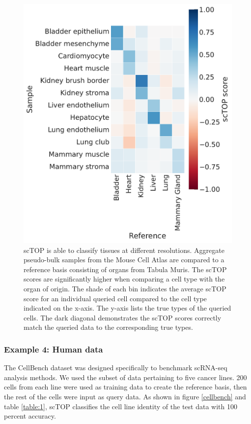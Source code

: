 \documentclass[aps,superscriptaddress, notitlepage,longbibliography]{revtex4-1}
\begin{document}
\begin{figure}
	\centering
    \includegraphics[scale=0.5]{figs/tabula muris heatmap.pdf}
	\caption{scTOP is able to classify tissues at different resolutions. Aggregate pseudo-bulk samples from the Mouse Cell Atlas are compared to a reference basis consisting of organs from Tabula Muris. The scTOP scores are significantly higher when comparing a cell type with the organ of origin. The shade of each bin indicates the average scTOP score for an individual queried cell compared to the cell type indicated on the x-axis. The y-axis lists the true types of the queried cells. The dark diagonal demonstrates the scTOP scores correctly match the queried data to the corresponding true types.}
	\label{tabula_muris}
\end{figure}

\subsubsection{Example 4:  Human data}

The CellBench dataset \cite{tian_benchmarking_2019} was designed specifically to benchmark scRNA-seq analysis methods. We used the subset of data pertaining to five cancer lines. 200 cells from each line were used as training data to create the reference basis, then the rest of the cells were input as query data. As shown in figure \ref{cellbench} and table \ref{table:1}, scTOP classifies the cell line identity of the test data with 100 percent accuracy.
\end{document}
